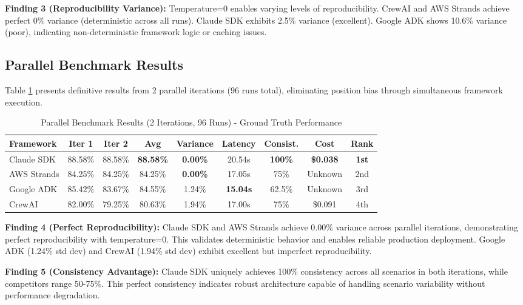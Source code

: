 \documentclass[sigconf,nonacm]{acmart}
\begin{document}
\textbf{Finding 3 (Reproducibility Variance):} Temperature=0 enables varying levels of reproducibility. CrewAI and AWS Strands achieve perfect 0\% variance (deterministic across all runs). Claude SDK exhibits 2.5\% variance (excellent). Google ADK shows 10.6\% variance (poor), indicating non-deterministic framework logic or caching issues.

\subsection{Parallel Benchmark Results}

Table \ref{tab:parallel-combined} presents definitive results from 2 parallel iterations (96 runs total), eliminating position bias through simultaneous framework execution.

\begin{table}[t]
\caption{Parallel Benchmark Results (2 Iterations, 96 Runs) - Ground Truth Performance}
\label{tab:parallel-combined}
\begin{tabular}{lcccccccc}
\toprule
\textbf{Framework} & \textbf{Iter 1} & \textbf{Iter 2} & \textbf{Avg} & \textbf{Variance} & \textbf{Latency} & \textbf{Consist.} & \textbf{Cost} & \textbf{Rank} \\
\midrule
Claude SDK & 88.58\% & 88.58\% & \textbf{88.58\%} & \textbf{0.00\%} & 20.54s & \textbf{100\%} & \textbf{\$0.038} & \textbf{1st} \\
AWS Strands & 84.25\% & 84.25\% & 84.25\% & \textbf{0.00\%} & 17.05s & 75\% & Unknown & 2nd \\
Google ADK & 85.42\% & 83.67\% & 84.55\% & 1.24\% & \textbf{15.04s} & 62.5\% & Unknown & 3rd \\
CrewAI & 82.00\% & 79.25\% & 80.63\% & 1.94\% & 17.00s & 75\% & \$0.091 & 4th \\
\bottomrule
\end{tabular}
\end{table}

\textbf{Finding 4 (Perfect Reproducibility):} Claude SDK and AWS Strands achieve 0.00\% variance across parallel iterations, demonstrating perfect reproducibility with temperature=0. This validates deterministic behavior and enables reliable production deployment. Google ADK (1.24\% std dev) and CrewAI (1.94\% std dev) exhibit excellent but imperfect reproducibility.

\textbf{Finding 5 (Consistency Advantage):} Claude SDK uniquely achieves 100\% consistency across all scenarios in both iterations, while competitors range 50-75\%. This perfect consistency indicates robust architecture capable of handling scenario variability without performance degradation.
\end{document}
